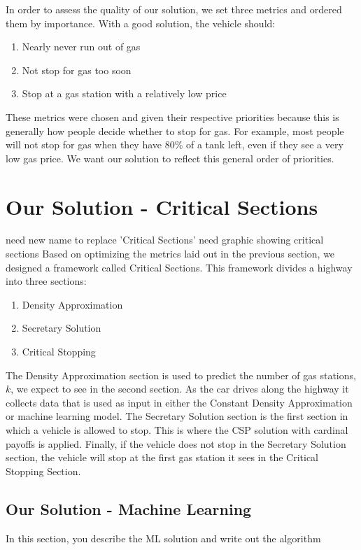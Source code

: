 \documentclass[conference]{IEEEtran}
\theoremstyle{definition}
\begin{document}
In order to assess the quality of our solution, we set three metrics and ordered them by importance. With a good solution, the vehicle should:

\begin{enumerate}
\item Nearly never run out of gas
\item Not stop for gas too soon
\item Stop at a gas station with a relatively low price
\end{enumerate}

These metrics were chosen and given their respective priorities because this is generally how people decide whether to stop for gas. For example, most people will not stop for gas when they have 80\% of a tank left, even if they see a very low gas price. We want our solution to reflect this general order of priorities.

\section{Our Solution - Critical Sections}
{\color{red} need new name to replace 'Critical Sections'}
{\color{red} need graphic showing critical sections}
Based on optimizing the metrics laid out in the previous section, we designed a framework called Critical Sections. This framework divides a highway into three sections:
\begin{enumerate}
    \item Density Approximation
    \item Secretary Solution
    \item Critical Stopping 
\end{enumerate}
The Density Approximation section is used to predict the number of gas stations, $k$, we expect to see in the second section. As the car drives along the highway it collects data that is used as input in either the Constant Density Approximation or machine learning model. The Secretary Solution section is the first section in which a vehicle is allowed to stop. This is where the CSP solution with cardinal payoffs is applied. Finally, if the vehicle does not stop in the Secretary Solution section, the vehicle will stop at the first gas station it sees in the Critical Stopping Section. 

\subsection{Our Solution - Machine Learning}
{\color{red} In this section, you describe the ML solution and write out the algorithm}
\end{document}
